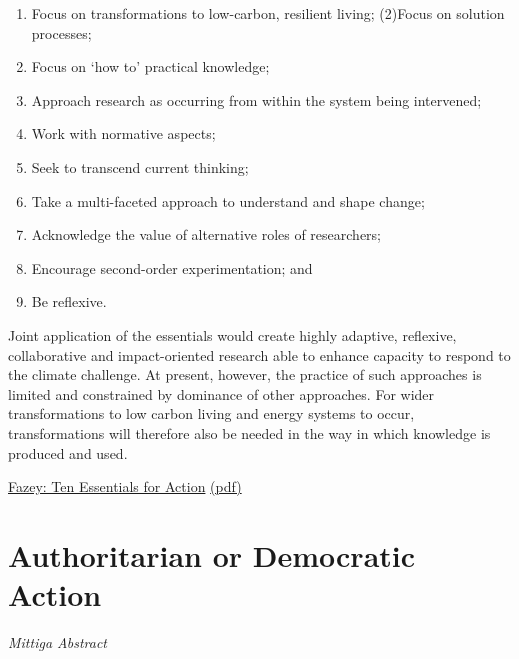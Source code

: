 \documentclass[
]{book}
\providecommand{\tightlist}{%
  \setlength{\itemsep}{0pt}\setlength{\parskip}{0pt}}
\begin{document}
\begin{enumerate}
\def\labelenumi{(\arabic{enumi})}
\tightlist
\item
  Focus on transformations to low-carbon, resilient living;
  (2)Focus on solution processes;
\item
  Focus on `how to' practical knowledge;
\item
  Approach research as occurring from within the system being intervened;
\item
  Work with normative aspects;
\item
  Seek to transcend current thinking;
\item
  Take a multi-faceted approach to understand and shape change;
\item
  Acknowledge the value of alternative roles of researchers;
\item
  Encourage second-order experimentation; and
\item
  Be reflexive.
\end{enumerate}

Joint application of the
essentials would create highly adaptive, reflexive, collaborative and impact-oriented research able to enhance
capacity to respond to the climate challenge. At present, however, the practice of such approaches is limited and
constrained by dominance of other approaches. For wider transformations to low carbon living and energy
systems to occur, transformations will therefore also be needed in the way in which knowledge is produced and
used.

\href{https://reader.elsevier.com/reader/sd/pii/S2214629617304413?token=817149646451360A90945310B67ABAC7C6C3EF55A11B2E9C4FF912AD621159A7360FF543919CFBD1F4C7B89342B7D78F}{Fazey: Ten Essentials for Action}
\href{pdf/Fazey_2018_Ten_Essentials_for_Action.pdf}{(pdf)}

\hypertarget{authoritarian-or-democratic-action}{%
\section{Authoritarian or Democratic Action}\label{authoritarian-or-democratic-action}}

\emph{Mittiga Abstract}
\end{document}
